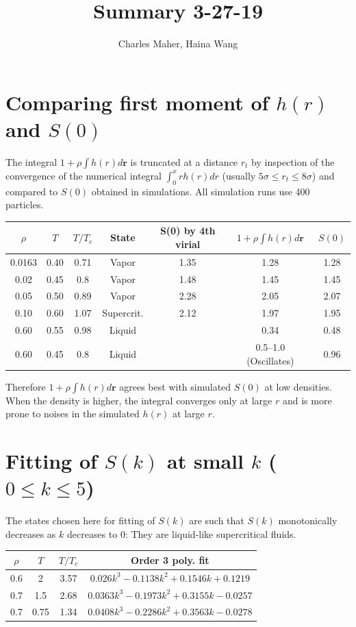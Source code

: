 \documentclass[journal=jacsat,manuscript=article]{achemso}
\author{Charles Maher, Haina Wang}
\affiliation[Princeton University]{Department of Chemistry Torquato Lab, Princeton University, Princeton, NJ 08544, USA}
\title{Summary 3-27-19}
\begin{document}
	\maketitle
	\newpage
	\section{Comparing first moment of $h(r)$ and $S(0)$}
	The integral $1+\rho\int h(r)d\mathbf{r}$ is truncated at a distance $r_t$ by inspection of the convergence of the numerical integral $\int_{0}^{x} rh(r)dr$ (usually $5\sigma\leq r_t\leq8\sigma$) and compared to $S(0)$ obtained in simulations. All simulation runs use 400 particles.
	
	\begin{center}
	\begin{tabular}{|c|c|c|c|c|c|c|}
		\hline 
		$\rho$ & $T$ & $T/T_c$ & State &S(0) by 4th virial & $1+\rho\int h(r)d\mathbf{r}$ & $S(0)$ \\ 
		\hline 
		0.0163 & 0.40 & 0.71 & Vapor & 1.35 & 1.28 & 1.28 \\ 
		\hline 
		0.02 & 0.45 & 0.8 & Vapor & 1.48 & 1.45 & 1.45 \\ 
		\hline 
		0.05 & 0.50 & 0.89 & Vapor & 2.28 & 2.05 & 2.07 \\
		\hline
		0.10 & 0.60 & 1.07 & Supercrit. & 2.12 & 1.97 & 1.95 \\
		\hline
		0.60 & 0.55 & 0.98 & Liquid & & 0.34 & 0.48 \\
		\hline
		0.60 & 0.45 & 0.8 & Liquid & & 0.5--1.0 (Oscillates) & 0.96 \\
		\hline
	\end{tabular} 
	\end{center}
	
	
	Therefore $1+\rho\int h(r)d\mathbf{r}$ agrees best with simulated $S(0)$ at low densities. When the density is higher, the integral converges only at large $r$ and is more prone to noises in the simulated $h(r)$ at large $r$.

\section{Fitting of $S(k)$ at small $k$ ($0\leq k\leq 5$)}
	The states chosen here for fitting of $S(k)$ are such that $S(k)$ monotonically decreases as $k$ decreases to 0: They are liquid-like supercritical fluids.
	
\begin{center}
		\begin{tabular}{|c|c|c|c|}
			\hline 
			$\rho$ & $T$ & $T/T_c$ & Order 3 poly. fit \\ 
			\hline 
			0.6 & 2 & 3.57 & $0.026k^3 - 0.1138k^2 + 0.1546k + 0.1219$ \\ 
			\hline 
			0.7 & 1.5 & 2.68 & $0.0363k^3 - 0.1973k^2 + 0.3155k - 0.0257$ \\ 
			\hline 
			0.7 & 0.75 & 1.34 & $0.0408k^3 - 0.2286k^2 + 0.3563k - 0.0278$ \\
			\hline
		\end{tabular} 
	\end{center}
\end{document}
